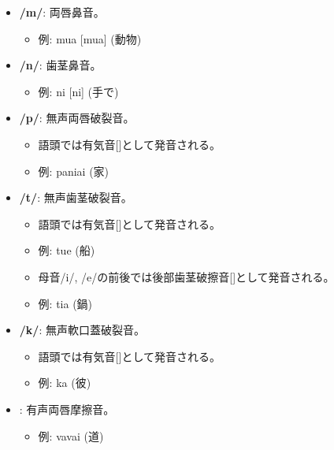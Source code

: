 \begin{itemize}
    \item \textbf{/m/}: 両唇鼻音。
    \begin{itemize}
        \item 例: mua [mua] (動物)
    \end{itemize}

    \item \textbf{/n/}: 歯茎鼻音。
    \begin{itemize}
        \item 例: ni [ni] (手で)
    \end{itemize}

    \item \textbf{/p/}: 無声両唇破裂音。
    \begin{itemize}
        \item 語頭では有気音[]として発音される。
        \item 例:  paniai  (家)
    \end{itemize}

    \item \textbf{/t/}: 無声歯茎破裂音。
    \begin{itemize}
        \item 語頭では有気音[]として発音される。
        \item 例: tue \textipa{[t\super{h}ue]} (船)
        \item 母音/i/, /e/の前後では後部歯茎破擦音[]として発音される。
        \item 例: tia \textipa{[tS\super{h}ia]} (鍋)
    \end{itemize}

    \item \textbf{/k/}: 無声軟口蓋破裂音。
    \begin{itemize}
        \item 語頭では有気音[]として発音される。
        \item 例: ka \textipa{[k\super{h}a]} (彼)
    \end{itemize}

    
\item \textbf{}: 有声両唇摩擦音。
    \begin{itemize}
        \item 例: vavai \textipa{[BaBai]} (道)
    \end{itemize}
    

\end{itemize}
